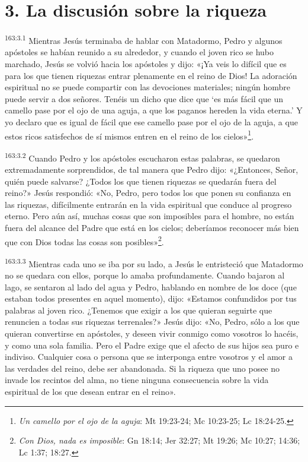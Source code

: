 \section*{3. La discusión sobre la riqueza}
\par
\textsuperscript{163:3.1} Mientras Jesús terminaba de hablar con Matadormo, Pedro y algunos apóstoles se habían reunido a su alrededor, y cuando el joven rico se hubo marchado, Jesús se volvió hacia los apóstoles y dijo: «¡Ya veis lo difícil que es para los que tienen riquezas entrar plenamente en el reino de Dios! La adoración espiritual no se puede compartir con las devociones materiales; ningún hombre puede servir a dos señores. Tenéis un dicho que dice que `es más fácil que un camello pase por el ojo de una aguja, a que los paganos hereden la vida eterna.' Y yo declaro que es igual de fácil que ese camello pase por el ojo de la aguja, a que estos ricos satisfechos de sí mismos entren en el reino de los cielos»\footnote{\textit{Un camello por el ojo de la aguja}: Mt 19:23-24; Mc 10:23-25; Lc 18:24-25.}.

\par
\textsuperscript{163:3.2} Cuando Pedro y los apóstoles escucharon estas palabras, se quedaron extremadamente sorprendidos, de tal manera que Pedro dijo: «¿Entonces, Señor, quién puede salvarse? ¿Todos los que tienen riquezas se quedarán fuera del reino?» Jesús respondió: «No, Pedro, pero todos los que ponen su confianza en las riquezas, difícilmente entrarán en la vida espiritual que conduce al progreso eterno. Pero aún así, muchas cosas que son imposibles para el hombre, no están fuera del alcance del Padre que está en los cielos; deberíamos reconocer más bien que con Dios todas las cosas son posibles»\footnote{\textit{Con Dios, nada es imposible}: Gn 18:14; Jer 32:27; Mt 19:26; Mc 10:27; 14:36; Lc 1:37; 18:27.}.

\par
\textsuperscript{163:3.3} Mientras cada uno se iba por su lado, a Jesús le entristeció que Matadormo no se quedara con ellos, porque lo amaba profundamente. Cuando bajaron al lago, se sentaron al lado del agua y Pedro, hablando en nombre de los doce (que estaban todos presentes en aquel momento), dijo: «Estamos confundidos por tus palabras al joven rico. ¿Tenemos que exigir a los que quieran seguirte que renuncien a todas sus riquezas terrenales?» Jesús dijo: «No, Pedro, sólo a los que quieran convertirse en apóstoles, y deseen vivir conmigo como vosotros lo hacéis, y como una sola familia. Pero el Padre exige que el afecto de sus hijos sea puro e indiviso. Cualquier cosa o persona que se interponga entre vosotros y el amor a las verdades del reino, debe ser abandonada. Si la riqueza que uno posee no invade los recintos del alma, no tiene ninguna consecuencia sobre la vida espiritual de los que desean entrar en el reino».

